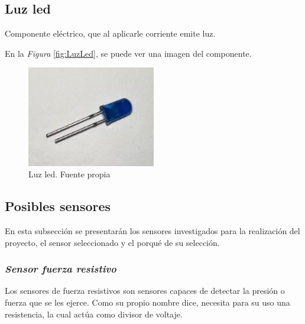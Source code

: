 \subsection{Luz led}
Componente eléctrico, que al aplicarle corriente emite luz.

En la \textit{Figura} \ref{fig:LuzLed}, se puede ver una imagen del componente.

\begin{figure}[h]
        \centering
        \includegraphics[width=0.5\textwidth]{img/Luzled.png}
        \caption{Luz led. Fuente propia}
        \label{fig:pinBoton}
    \end{figure}
    
\subsection{Posibles sensores}
En esta subsección se presentarán los sensores investigados para la realización del proyecto, el sensor seleccionado y el porqué de su selección.
\subsubsection{\textit{{Sensor fuerza resistivo}}}
Los sensores de fuerza resistivos son sensores capaces de detectar la presión o fuerza que se les ejerce.
Como su propio nombre dice, necesita para su uso una resistencia, la cual actúa como divisor de voltaje.
